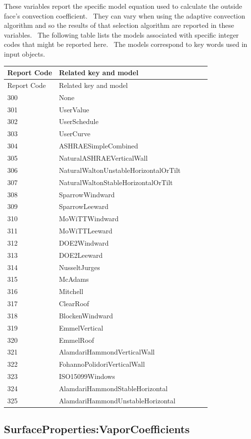 These variables report the specific model equation used to calculate the outside face's convection coefficient.~ They can vary when using the adaptive convection algorithm and so the results of that selection algorithm are reported in these variables.~ The following table lists the models associated with specific integer codes that might be reported here.~ The models correspond to key words used in input objects.

\begin{longtable}[c]{@{}ll@{}}
\toprule
Report Code & Related key and model \tabularnewline
\midrule
\endfirsthead

\toprule
Report Code & Related key and model \tabularnewline
\midrule
\endhead

300 & None~ \tabularnewline
301 & UserValue \tabularnewline
302 & UserSchedule \tabularnewline
303 & UserCurve~~~~~~~~~~~~~~~~~~~~~~~~~~~~~~ \tabularnewline
304 & ASHRAESimpleCombined~~~~~~~~~~~~~~~~~~~ \tabularnewline
305 & NaturalASHRAEVerticalWall~~~~~~~~~~~~~~ \tabularnewline
306 & NaturalWaltonUnstableHorizontalOrTilt~~ \tabularnewline
307 & NaturalWaltonStableHorizontalOrTilt~~~~ \tabularnewline
308 & SparrowWindward~~~~~~~~~~~~~~~~~~~~~~~~ \tabularnewline
309 & SparrowLeeward~~~~~~~~~~~~~~~~~~~~~~~~~ \tabularnewline
310 & MoWiTTWindward~~~~~~~~~~~~~~~~~~~~~~~~~ \tabularnewline
311 & MoWiTTLeeward~~~~~~~~~~~~~~~~~~~~~~~~~~ \tabularnewline
312 & DOE2Windward~~~~~~~~~~~~~~~~~~~~~~~~~~~ \tabularnewline
313 & DOE2Leeward~~~~~~~~~~~~~~~~~~~~~~~~~~~~ \tabularnewline
314 & NusseltJurges~~~~~~~~~~~~~~~~~~~~~~~~~~ \tabularnewline
315 & McAdams~~~~~~~~~~~~~~~~~~~~~~~~~~~~~~~~ \tabularnewline
316 & Mitchell~~~~~~~~~~~~~~~~~~~~~~~~~~~~~~~ \tabularnewline
317 & ClearRoof~~~~~~~~~~~~~~~~~~~~~~~~~~~~~~ \tabularnewline
318 & BlockenWindward~~~~~~~~~~~~~~~~~~~~~~~~ \tabularnewline
319 & EmmelVertical~~~~~~~~~~~~ ~~~~~~~~~~~~~~ \tabularnewline
320 & EmmelRoof~~~~~~~~~~~~~~~~~~~~~~~~~~~~~~ \tabularnewline
321 & AlamdariHammondVerticalWall~~~~~~~~~~~~ \tabularnewline
322 & FohannoPolidoriVerticalWall~~~~~~~~~~~~ \tabularnewline
323 & ISO15099Windows~~~~~~~~~~~~~~~~~~~~~~~~ \tabularnewline
324 & AlamdariHammondStableHorizontal~~~~~~~~ \tabularnewline
325 & AlamdariHammondUnstableHorizontal~~~~~~ \tabularnewline
\bottomrule
\end{longtable}

\subsection{SurfaceProperties:VaporCoefficients}\label{surfacepropertiesvaporcoefficients}

